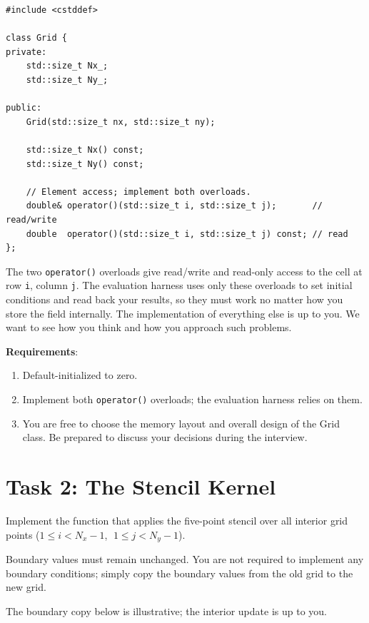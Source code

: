 \documentclass[11pt, a4paper]{article}
\newcommand{\code}[1]{\texttt{#1}}
\begin{document}
\begin{lstlisting}[style=cppinterface]
#include <cstddef>

class Grid {
private:
    std::size_t Nx_;
    std::size_t Ny_;

public:
    Grid(std::size_t nx, std::size_t ny);

    std::size_t Nx() const;
    std::size_t Ny() const;

    // Element access; implement both overloads.
    double& operator()(std::size_t i, std::size_t j);       // read/write
    double  operator()(std::size_t i, std::size_t j) const; // read
};
\end{lstlisting}

The two \code{operator()} overloads give read/write and read-only access to the cell at row \code{i}, column \code{j}. The evaluation harness uses only these overloads to set initial conditions and read back your results, so they must work no matter how you store the field internally. The implementation of everything else is up to you. We want to see how you think and how you approach such problems.

\vspace{6pt}

\noindent \textbf{Requirements}:
\begin{enumerate}[leftmargin=1.5em, itemsep=0.2em]
    \item Default-initialized to zero.
    \item Implement both \code{operator()} overloads; the evaluation harness relies on them.
    \item You are free to choose the memory layout and overall design of the Grid class. Be prepared to discuss your decisions during the interview.
\end{enumerate}

\section{Task 2: The Stencil Kernel}

Implement the function that applies the five-point stencil over all interior grid points ($1 \leq i < N_x - 1$, $\; 1 \leq j < N_y - 1$).

Boundary values must remain unchanged. You are not required to implement any boundary conditions; simply copy the boundary values from the old grid to the new grid.

\noindent The boundary copy below is illustrative; the interior update is up to you.
\end{document}

